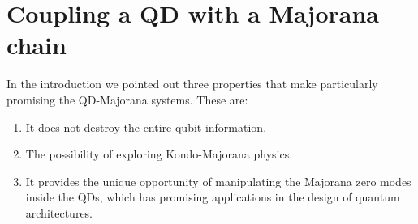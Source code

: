 \chapter{Coupling a QD with a Majorana chain \label{chap:Majorana} \label{sec:QD-Majorana}}














In the introduction we pointed out three properties that make particularly promising the QD-Majorana systems. These are:
\begin{enumerate}
\item It does not destroy the entire qubit information.
\item The possibility of exploring Kondo-Majorana physics.
\item It provides the unique opportunity of manipulating the Majorana zero modes inside the QDs, which has promising applications in the design of quantum architectures. 
\end{enumerate}



